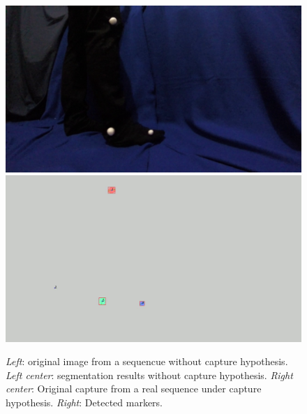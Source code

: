 \begin{figure}[ht!]
        {\includegraphics[scale=0.07]{imagenes/orig.png}\label{abelvideo2}}\hspace{1 mm}
        {\includegraphics[scale=0.07]{imagenes/detect.png}
        \label{abeldetect}}
      \caption{%
       \textit{Left}: original image from a sequencue without capture hypothesis. 
       \textit{Left center}: segmentation results without capture hypothesis.
       \textit{Right center}: Original capture from a real sequence under capture hypothesis.
       \textit{Right}: Detected markers.}  
      \label{ejemploabelumbr2}
\end{figure}
\vspace{-0.6cm}